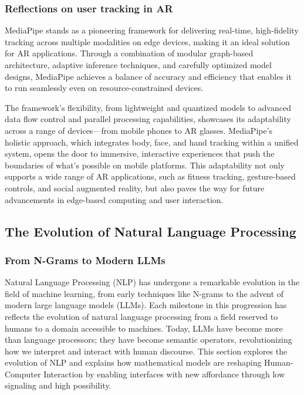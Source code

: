 \subsubsection{Reflections on user tracking in AR}

MediaPipe stands as a pioneering framework for delivering real-time, high-fidelity tracking across multiple modalities on edge devices, making it an ideal solution for AR applications.
Through a combination of modular graph-based architecture, adaptive inference techniques, and carefully optimized model designs, MediaPipe achieves a balance of accuracy and efficiency that enables it to run seamlessly even on resource-constrained devices.

The framework’s flexibility, from lightweight and quantized models to advanced data flow control and parallel processing capabilities, showcases its adaptability across a range of devices—from mobile phones to AR glasses.
MediaPipe’s holistic approach, which integrates body, face, and hand tracking within a unified system, opens the door to immersive, interactive experiences that push the boundaries of what’s possible on mobile platforms.
This adaptability not only supports a wide range of AR applications, such as fitness tracking, gesture-based controls, and social augmented reality, but also paves the way for future advancements in edge-based computing and user interaction.

\subsection{ The Evolution of Natural Language Processing}

\subsubsection{ From N-Grams to Modern LLMs}

Natural Language Processing (NLP) has undergone a remarkable evolution in the field of machine learning, from early techniques like N-grams \cite{Mar13} to the advent of modern large language models (LLMs).
Each milestone in this progression has reflects the evolution of natural language processing from a field reserved to humans to a domain accessible to machines.
Today, LLMs have become more than language processors; they have become semantic operators, revolutionizing how we interpret and interact with human discourse.
This section explores the evolution of NLP and explains how mathematical models are reshaping Human-Computer Interaction by enabling interfaces with new affordance through low signaling and high possibility.


